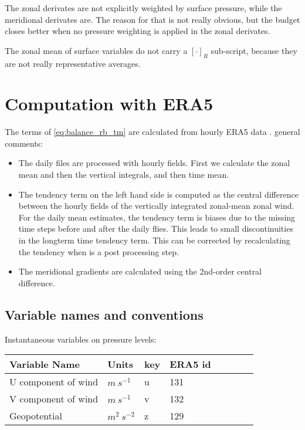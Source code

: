 \documentclass[11pt]{article}
\numberwithin{equation}{section}
\begin{document}
The zonal derivates are not explicitly weighted by surface pressure, while the meridional derivates are. The reason for that is not really obvious, but the budget closes better when no pressure weighting is applied in the zonal derivates.\par
The zonal mean of surface variables do not carry a $[\cdot]_R$ sub-script, because they are not really representative averages.


\section{Computation with ERA5}
The terms of \eqref{eq:balance_rb_tm} are calculated from hourly ERA5 data \citep{EuropeanCentreForMedium-RangeWeatherForecasts2017}. general comments:

\begin{itemize}

\item The daily files are processed with hourly fields. First we calculate the zonal mean and then the vertical integrals, and then time mean.

\item The tendency term on the left hand side is computed as the central difference between the hourly fields of the vertically integrated zonal-mean zonal wind. For the daily mean estimates, the tendency term is biases due to the missing time steps before and after the daily flies. This leads to small discontinuities in the longterm time tendency term. This can be corrected by recalculating the tendency when is a post processing step.
\item The meridional gradients are calculated using the 2nd-order central difference.
\end{itemize}


\subsection{Variable names and conventions}

Instantaneous variables on pressure levels:
\begin{table}[h!]
\label{table:pressure_var}
\begin{center}
    \begin{tabular}{ | l | l | l | l | l | l | l | l |}
    \hline
    Variable Name & Units & key & ERA5 id \\ \hline
     U component of wind & $m~s^{-1}$   & u    &  131  \\ \hline
     V component of wind & $m~s^{-1}$   & v    &  132\\ \hline
     Geopotential & $m^2~s^{-2}$   & z    &  129\\ \hline
        \end{tabular}
\end{center}
\end{table}
\end{document}

